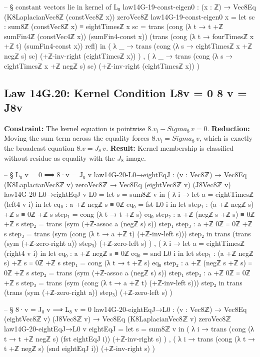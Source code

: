 \documentclass[11pt,a4paper]{book}
\def\Sigma{Sigma}%
\def\Leftrightarrow{<=>}%
\def\cdot{.}%
\def\texorpdfstring#1#2{#2}%
\begin{document}
\begin{code}
-- § constant vectors lie in kernel of L₈
law14G-19-const-eigen0 : (x : ℤ) → Vec8Eq (K8LaplacianVec8ℤ (constVec8ℤ x)) zeroVec8ℤ
law14G-19-const-eigen0 x =
  let sc : sum8ℤ (constVec8ℤ x) ≡ eightTimesℤ x
      sc =
        trans
          (cong (λ t → t +ℤ sumFin4ℤ (constVec4ℤ x)) (sumFin4-const x))
          (trans
            (cong (λ t → fourTimesℤ x +ℤ t) (sumFin4-const x))
            refl)
  in
  ( λ _ →
      trans
        (cong (λ s → eightTimesℤ x +ℤ negℤ s) sc)
        (+ℤ-inv-right (eightTimesℤ x))
  ) ,
  ( λ _ →
      trans
        (cong (λ s → eightTimesℤ x +ℤ negℤ s) sc)
        (+ℤ-inv-right (eightTimesℤ x))
  )
\end{code}

\subsection{Law 14G.20: Kernel Condition \texorpdfstring{$L_8\,v = 0 \Leftrightarrow 8 \cdot v = J_8\,v$}{L8v = 0 8 v = J8v}}

\textbf{Constraint:} The kernel equation is pointwise $8 \cdot v_i - \Sigma_8\,v = 0$.
\textbf{Reduction:} Moving the sum term across the equality forces $8 \cdot v_i = \Sigma_8\,v$,
which is exactly the broadcast equation $8 \cdot v = J_8\,v$.
\textbf{Result:} Kernel membership is classified without residue as equality with the $J_8$ image.

\begin{code}
-- § L₈ v = 0 ⟹ 8·v = J₈ v
law14G-20-L0→eightEqJ : (v : Vec8ℤ) → Vec8Eq (K8LaplacianVec8ℤ v) zeroVec8ℤ → Vec8Eq (eightVec8ℤ v) (J8Vec8ℤ v)
law14G-20-L0→eightEqJ v L0 =
  let s = sum8ℤ v in
  ( λ i →
      let a = eightTimesℤ (left4 v i) in
      let eq₀ : a +ℤ negℤ s ≡ 0ℤ
          eq₀ = fst L0 i
      in
      let step₁ : (a +ℤ negℤ s) +ℤ s ≡ 0ℤ +ℤ s
          step₁ = cong (λ t → t +ℤ s) eq₀
          step₂ : a +ℤ (negℤ s +ℤ s) ≡ 0ℤ +ℤ s
          step₂ = trans (sym (+ℤ-assoc a (negℤ s) s)) step₁
          step₃ : a +ℤ 0ℤ ≡ 0ℤ +ℤ s
          step₃ = trans (sym (cong (λ t → a +ℤ t) (+ℤ-inv-left s))) step₂
      in
      trans
        (trans (sym (+ℤ-zero-right a)) step₃)
        (+ℤ-zero-left s)
  ) ,
  ( λ i →
      let a = eightTimesℤ (right4 v i) in
      let eq₀ : a +ℤ negℤ s ≡ 0ℤ
          eq₀ = snd L0 i
      in
      let step₁ : (a +ℤ negℤ s) +ℤ s ≡ 0ℤ +ℤ s
          step₁ = cong (λ t → t +ℤ s) eq₀
          step₂ : a +ℤ (negℤ s +ℤ s) ≡ 0ℤ +ℤ s
          step₂ = trans (sym (+ℤ-assoc a (negℤ s) s)) step₁
          step₃ : a +ℤ 0ℤ ≡ 0ℤ +ℤ s
          step₃ = trans (sym (cong (λ t → a +ℤ t) (+ℤ-inv-left s))) step₂
      in
      trans
        (trans (sym (+ℤ-zero-right a)) step₃)
        (+ℤ-zero-left s)
  )

-- § 8·v = J₈ v ⟹ L₈ v = 0
law14G-20-eightEqJ→L0 : (v : Vec8ℤ) → Vec8Eq (eightVec8ℤ v) (J8Vec8ℤ v) → Vec8Eq (K8LaplacianVec8ℤ v) zeroVec8ℤ
law14G-20-eightEqJ→L0 v eightEqJ =
  let s = sum8ℤ v in
  ( λ i →
      trans
        (cong (λ t → t +ℤ negℤ s) (fst eightEqJ i))
        (+ℤ-inv-right s)
  ) ,
  ( λ i →
      trans
        (cong (λ t → t +ℤ negℤ s) (snd eightEqJ i))
        (+ℤ-inv-right s)
  )
\end{code}
\end{document}
